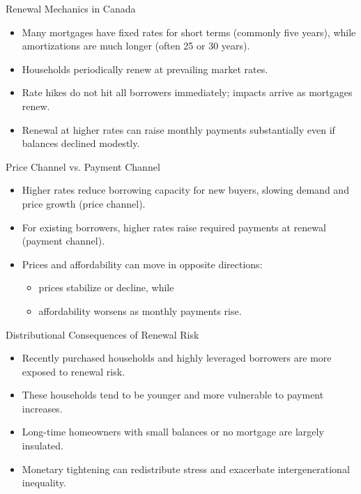 \documentclass[aspectratio=169]{beamer}
\begin{document}
\begin{frame}{Renewal Mechanics in Canada}
\transfade
\begin{itemize}[<+->]
  \item Many mortgages have fixed rates for short terms (commonly five years), while amortizations are much longer (often 25 or 30 years).
  \item Households periodically renew at prevailing market rates.
  \item Rate hikes do not hit all borrowers immediately; impacts arrive as mortgages renew.
  \item Renewal at higher rates can raise monthly payments substantially even if balances declined modestly.
\end{itemize}
\end{frame}

\begin{frame}{Price Channel vs. Payment Channel}
\transfade
\begin{itemize}[<+->]
  \item Higher rates reduce borrowing capacity for new buyers, slowing demand and price growth (price channel).
  \item For existing borrowers, higher rates raise required payments at renewal (payment channel).
  \item Prices and affordability can move in opposite directions:
  \begin{itemize}[<+->]
    \item prices stabilize or decline, while
    \item affordability worsens as monthly payments rise.
  \end{itemize}
\end{itemize}
\end{frame}



\begin{frame}{Distributional Consequences of Renewal Risk}
\transfade
\begin{itemize}[<+->]
  \item Recently purchased households and highly leveraged borrowers are more exposed to renewal risk.
  \item These households tend to be younger and more vulnerable to payment increases.
  \item Long-time homeowners with small balances or no mortgage are largely insulated.
  \item Monetary tightening can redistribute stress and exacerbate intergenerational inequality.
\end{itemize}
\end{frame}
\end{document}
